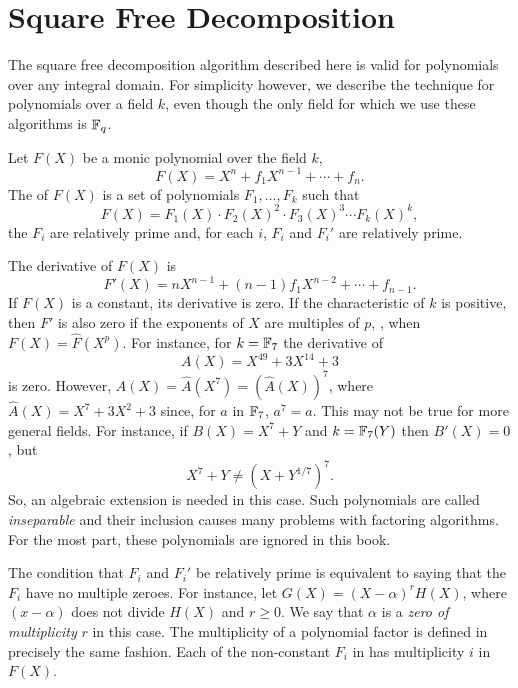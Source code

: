 \section{Square Free Decomposition}
\label{FFac:Sqfr:Sec}

The square free decomposition algorithm described here is
valid for polynomials over any integral domain.  For simplicity
however, we describe the technique for polynomials over a field
$k$, even though the only field for which we use these algorithms is
$\mathbb{F}_q$.  


Let $F(X)$ be a monic polynomial over the field $k$,
\[
F(X) = X^n + f_1 X^{n-1} + \cdots + f_n.
\]
The  of $F(X)$ is a set of polynomials $F_1, \ldots,
F_k$ such that
\begin{equation}\label{FFac:Sqfr:Eq}
F(X) = F_1(X) \cdot F_2(X)^2 \cdot F_3(X)^3 \cdots F_k(X)^k,
\end{equation}
the $F_i$ are relatively prime and, for each $i$, $F_i$ and $F_i'$ are
relatively prime.  

The derivative of $F(X)$ is
\[
F'(X) = nX^{n-1} + (n-1) f_1 X^{n-2} + \cdots + f_{n-1}.
\]
If $F(X)$ is a constant, its derivative is zero.  If the characteristic 
of $k$ is positive, then $F'$ is also zero if the exponents of $X$ are 
multiples of $p$, \ie, when $F(X) = \hat{F}(X^p)$.  For instance, for $k= 
\mathbb{F}_7$ the derivative of 
\[
A(X) = X^{49} + 3 X^{14} + 3
\]
is zero.  However, $A(X) = 
\hat{A}(X^7) = (\hat{A}(X))^7$, where $\hat{A}(X) = X^7 +3X^2 + 3$ since, 
for $a$ in $\mathbb{F}_7$, $a^7 = a$.  This may not be true for more general 
fields.  For instance, if $B(X) = X^7 +Y$ and $k = \mathbb{F}_7(Y)$ then 
$B'(X) = 0$, but 
\[
X^7 + Y \not= (X+Y^{1/7})^7.
\]
So, an algebraic extension is needed in this case.  Such polynomials are 
called {\em inseparable} and their inclusion causes many problems with 
factoring algorithms.  For the most part, 
these polynomials are ignored in this book. 

The condition that $F_i$ and $F_i'$ be relatively prime is equivalent
to saying that the $F_i$ have no multiple zeroes.  For instance, let
$G(X) = (X - \alpha)^r H(X)$, where $(x - \alpha)$ does not divide
$H(X)$ and $r \ge 0$.  We say that $\alpha$ is a {\em zero of
multiplicity} $r$ in this
case.  The multiplicity of a polynomial factor is defined in precisely the same fashion.  Each
of the non-constant $F_i$ in  has multiplicity $i$
in $F(X)$.

